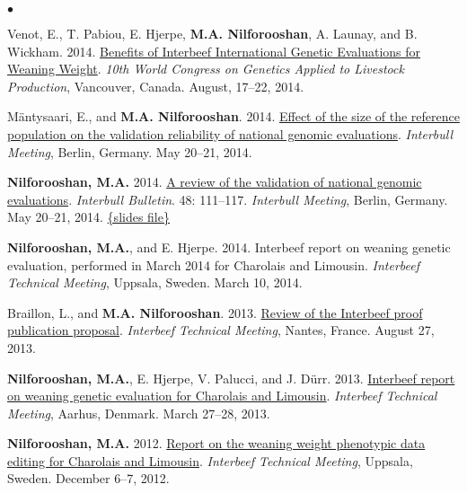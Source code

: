 \documentclass[margin,line]{res}
\newenvironment{list2}{
  \begin{list}{$\bullet$}{%
    \setlength{\itemsep}{0in}
    \setlength{\parsep}{0in} \setlength{\parskip}{0in}
    \setlength{\topsep}{0in} \setlength{\partopsep}{0in}
    \setlength{\leftmargin}{0.2in}}}
  {\end{list}}
\begin{document}
\begin{resume}
\begin{list2}
    \item Venot, E., T. Pabiou, E. Hjerpe, {\bf M.A. Nilforooshan}, A. Launay, and B. Wickham. 2014. \href{https://www.researchgate.net/publication/268109933_Benefits_of_Interbeef_international_genetic_evaluations_for_weaning_weight}{Benefits of Interbeef International Genetic Evaluations for Weaning Weight}. {\em 10th World Congress on Genetics Applied to Livestock Production}, Vancouver, Canada. August, 17--22, 2014.
    \item M\"{a}ntysaari, E., and {\bf M.A. Nilforooshan}. 2014. \href{https://drive.google.com/file/d/0B2l_izQwJmVpY3B1dTRtMmlWV1E/view?usp=sharing&resourcekey=0-noBm5g1J1txJWu7nFhvD1A}{Effect of the size of the reference population on the validation reliability of national genomic evaluations}. {\em Interbull Meeting}, Berlin, Germany. May 20--21, 2014.
    \item {\bf Nilforooshan, M.A.} 2014. \href{https://www.researchgate.net/publication/358198989_A_Review_of_the_Validation_of_National_Genomic_Evaluations}{A review of the validation of national genomic evaluations}. {\em Interbull Bulletin}. 48: 111--117. {\em Interbull Meeting}, Berlin, Germany. May 20--21, 2014. \href{https://drive.google.com/file/d/0B2l_izQwJmVpdmxrUjF5WGc1X3c/view?usp=sharing&resourcekey=0-OBCPGDhhf3PpkbQL_lwMXg}{\{slides file\}}
    \item {\bf Nilforooshan, M.A.}, and E. Hjerpe. 2014. Interbeef report on weaning genetic evaluation, performed in March 2014 for Charolais and Limousin. {\em Interbeef Technical Meeting}, Uppsala, Sweden. March 10, 2014.
    \item Braillon, L., and {\bf M.A. Nilforooshan}. 2013. \href{https://drive.google.com/file/d/0B2l_izQwJmVpYWE2VndwNGhJblU/view?usp=sharing&resourcekey=0-lK2OKh6je4O4Dz_z0I9jJg}{Review of the Interbeef proof publication proposal}. {\em Interbeef Technical Meeting}, Nantes, France. August 27, 2013.
    \item {\bf Nilforooshan, M.A.}, E. Hjerpe, V. Palucci, and J. D\"{u}rr. 2013. \href{https://drive.google.com/file/d/0B2l_izQwJmVpZ2RRcXc0bS11RmM/view?usp=sharing&resourcekey=0-mJU9o7o9WqG3XXCrFYq9Xw}{Interbeef report on weaning genetic evaluation for Charolais and Limousin}. {\em Interbeef Technical Meeting}, Aarhus, Denmark. March 27--28, 2013.
    \item {\bf Nilforooshan, M.A.} 2012. \href{https://drive.google.com/file/d/0B2l_izQwJmVpLVY5NU1UZGR6czA/view?usp=sharing&resourcekey=0-z2Uuf8hnh-P_CXmZJ6iNXw}{Report on the weaning weight phenotypic data editing for Charolais and Limousin}. {\em Interbeef Technical Meeting}, Uppsala, Sweden. December 6--7, 2012.

\end{list2}
\end{resume}
\end{document}
